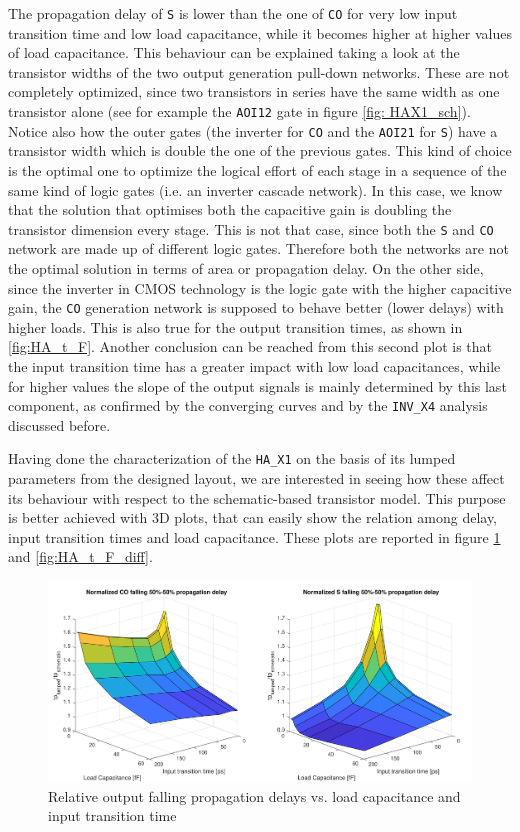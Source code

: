 \documentclass[a4paper]{article}
\newcommand{\inv}{\texttt{INV\_X4}\xspace}
\newcommand{\ha}{\texttt{HA\_X1}\xspace}
\begin{document}
The propagation delay of \texttt{S} is lower than the one of \texttt{CO} for very low input transition time and low load capacitance, while it becomes higher at higher values of load capacitance. This behaviour can be explained taking a look at the transistor widths of the two output generation pull-down networks. These are not completely optimized, since two transistors in series have the same width as one transistor alone (see for example the \texttt{AOI12} gate in figure \ref{fig: HAX1_sch}). Notice also how the outer gates (the inverter for \texttt{CO} and the \texttt{AOI21} for \texttt{S}) have a transistor width which is double the one of the previous gates. This kind of choice is the optimal one to optimize the logical effort of each stage in a sequence of the same kind of logic gates (i.e. an inverter cascade network). In this case, we know that the solution that optimises both the capacitive gain is doubling the transistor dimension every stage. This is not that case, since both the \texttt{S} and \texttt{CO} network are made up of different logic gates. Therefore both the networks are not the optimal solution in terms of area or propagation delay. On the other side, since the inverter in CMOS technology is the logic gate with the higher capacitive gain, the \texttt{CO} generation network is supposed to behave better (lower delays) with higher loads. This is also true for the output transition times, as shown in \ref{fig:HA_t_F}. Another conclusion can be reached from this second plot is that the input transition time has a greater impact with low load capacitances, while for higher values the slope of the output signals is mainly determined by this last component, as confirmed by the converging curves and by the \inv analysis discussed before.

Having done the characterization of the \ha on the basis of its lumped parameters from the designed layout, we are interested in seeing how these affect its behaviour with respect to the schematic-based transistor model. This purpose is better achieved with 3D plots, that can easily show the relation among delay, input transition times and load capacitance. These plots are reported in figure \ref{fig:HA_tp_L_diff} and \ref{fig:HA_t_F_diff}.

\begin{figure}[ht]
	\includegraphics[width=\linewidth]{Images/HA/tp_L_diff_crop.pdf}
	\caption{Relative output falling propagation delays vs. load capacitance and input transition time}
	\label{fig:HA_tp_L_diff}
\end{figure}
\end{document}
